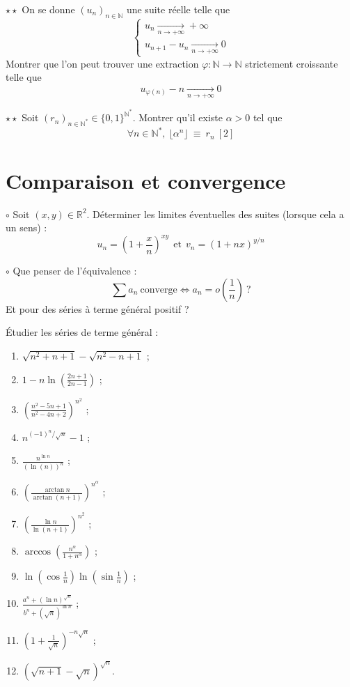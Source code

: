 \documentclass[french,a4paper]{article}
\newcommand{\N}{\mathbb{N}}
\newcommand{\R}{\mathbb{R}}
\newcommand{\st}{^*}
\theoremstyle{plain}
\theoremstyle{definition}
\theoremstyle{remark}
\begin{document}
\begin{ex}[Morlot]{$\star\star$}
	On se donne $(u_n)_{n\in\N}$ une suite réelle telle que $$\begin{cases}
		u_{n}\xrightarrow[n\to+\infty]{}+\infty\\
		u_{n+1}-u_{n}\xrightarrow[n\to+\infty]{}0
	\end{cases}$$ Montrer que l'on peut trouver une extraction $\varphi:\N\to\N$ strictement croissante telle que $$u_{\varphi(n)}-n\xrightarrow[n\to+\infty]{}0$$
\end{ex}

\begin{ex}[Morlot]{$\star\star$}
	Soit $(r_n)_{n\in\N\st}\in\{0,1\}^{\N\st}$. Montrer qu'il existe $\alpha>0$ tel que $$\forall n\in\N\st,\ \lfloor\alpha^n\rfloor\ \equiv\ r_n\ [2]$$
\end{ex}

\section{Comparaison et convergence}

\begin{ex}[Moulin.05]{$\circ$}
	Soit $(x,y)\in\R^2$. Déterminer les limites éventuelles des suites (lorsque cela a un sens) : $$u_n=\left(1+\frac{x}{n}\right)^{xy}\ \ \text{et}\ \ v_n=(1+nx)^{y/n}$$
\end{ex}

\begin{ex}[Moulin.06]{$\circ$}
	Que penser de l'équivalence : $$\sum a_n\ \text{converge}\iff a_n=o\left(\frac{1}{n}\right)\ ?$$ Et pour des séries à terme général positif ?
\end{ex}

\begin{ex}[Moulin.07]{}
	Étudier les séries de terme général :
	\begin{enumerate}
		\item $\sqrt{n^2+n+1}-\sqrt{n^2-n+1}$ ;
		\item $1-\displaystyle n\ln\left(\frac{2n+1}{2n-1}\right)$ ;
		\item $\displaystyle\left(\frac{n^2-5n+1}{n^2-4n+2}\right)^{n^2}$ ;
		\item $\displaystyle n^{(-1)^n/\sqrt{n}}-1$ ;
		\item $\displaystyle\frac{n^{\ln n}}{(\ln(n))^n}$ ;
		\item $\displaystyle\left(\frac{\arctan n}{\arctan(n+1)}\right)^{n^\alpha}$ ;
		\item $\displaystyle\left(\frac{\ln n}{\ln(n+1)}\right)^{n^2}$ ;
		\item $\displaystyle\arccos\left(\frac{n^\alpha}{1+n^\alpha}\right)$ ;
		\item $\displaystyle\ln\left(\cos\frac{1}{n}\right)\ln\left(\sin\frac{1}{n}\right)$ ;
		\item $\displaystyle\frac{a^n+(\ln n)^{\sqrt{n}}}{b^n+(\sqrt{n})^{\ln n}}$ ;
		\item $\displaystyle\left(1+\frac{1}{\sqrt{n}}\right)^{-n\sqrt{n}}$ ;
		\item $\displaystyle\left(\sqrt{n+1}-\sqrt{n}\right)^{\sqrt{n}}$.
	\end{enumerate}
\end{ex}
\end{document}
